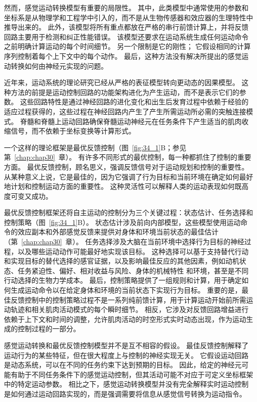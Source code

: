 然而，感觉运动转换模型有重要的局限性。
其中，此类模型中通常使用的参数和坐标系是从物理学和工程学中引入的，而不是从生物传感器和效应器的生理特性中推导出来的。
此外，该模型将所有重点都放在严格的串行前馈计算上，并将反馈回路主要用于检测和纠正性能错误。
该模型还要求在运动系统生成任何运动命令之前明确计算运动的每个时间细节。
另一个限制是它的刚性；
它假设相同的计算序列控制着每个上下文中的每个动作。
最后，这种方法没有解决所提出的感觉运动转换如何由神经元实现的问题。


近年来，运动系统的理论研究已经从严格的表征模型转向更动态的因果模型。
这种方法的前提是运动控制回路的功能架构进化为产生运动，而不是表示它们的参数。
这些回路特性是通过神经回路的进化变化和出生后发育过程中依赖于经验的适应过程获得的，这些过程在神经回路内产生了产生所需运动所必需的突触连接模式。
脊髓和脊髓上运动回路确保脊髓运动神经元在任务条件下产生适当的肌肉收缩信号，而不依赖于坐标变换等计算形式。


一个这样的理论框架是最优反馈控制（图~\ref{fig:34_1}B；参见第~\ref{chap:chap30}~章）。
有许多不同形式的最优控制，每一种都抓住了控制的重要方面。
最优反馈控制，顾名思义，强调反馈信号对于运动规划和控制的重要性。
从某种意义上说，它是最佳的，因为它强调了行为目标和当前环境在确定如何最好地计划和控制运动方面的重要性。
这种灵活性可以解释人类的运动表现如何既高度可变又成功。


最优反馈控制框架还将自主运动的控制分为三个关键过程：状态估计、任务选择和控制策略（图~\ref{fig:34_1}B）。
状态估计涉及前向内部模型，这些模型使用运动命令的效应副本和外部感觉反馈来提供对身体和环境当前状态的最佳估计（第~\ref{chap:chap30}~章）。
任务选择涉及大脑在当前环境中选择行为目标的神经过程，以及哪些运动动作可能最好地实现该目标。
这种选择可以基于支持替代行动和实现目标的替代选择的感官证据，以及影响最佳反应的其他因素，例如动机状态、任务紧迫性、偏好、相对收益与风险、身体的机械特性 和环境，甚至是不同行动选择的生物力学成本。
最后，控制策略提供了一组规则和计算，用于确定如何生成运动命令以在给定身体和环境的当前状态下实现行为目标。
重要的是，最佳反馈控制中的控制策略过程不是一系列纯前馈计算，用于计算运动开始前所需运动轨迹和相关肌肉活动模式的每个瞬时细节。
相反，它涉及对反馈回路增益进行依赖于上下文和时间的调整，允许肌肉活动的时空形式实时动态出现，作为运动生成的控制过程的一部分。


感觉运动转换和最优反馈控制模型并不是互不相容的假设。
最佳反馈控制解释了运动行为的某些特征，但在很大程度上与控制的神经实现无关。
它假设运动回路是动态系统，可以在不同的任务约束下达到预期的目标。
因此，给定的神经元可能有助于不同任务条件下的感觉运动控制，但其活动可能不对应于可定义坐标框架中的特定运动参数。
相比之下，感觉运动转换模型并没有完全解释实时运动控制是如何通过运动回路实现的，而是强调需要将信息从感觉信号转换为运动指令。


